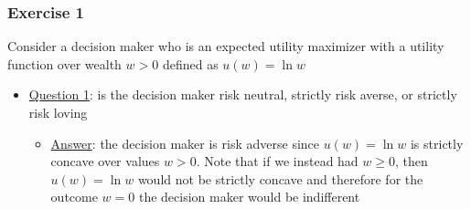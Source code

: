 \documentclass{article}
\begin{document}
\subsubsection{Exercise 1}
Consider a decision maker who is an expected utility maximizer with a utility function over wealth $w > 0$ defined as $u(w) = \ln w$ \par \vspace{0.3em}
  \begin{itemize}
    \item  \underline{Question 1}: is the decision maker risk neutral, strictly risk averse, or strictly risk loving
    \begin{itemize}
      \item  \underline{Answer}: the decision maker is risk adverse since $u(w) = \ln w$ is strictly concave over values $w > 0$. Note that if we instead had $w \geq 0$, then $u(w) = \ln w$ would not be strictly concave and therefore for the outcome $w=0$ the decision maker would be indifferent
    \end{itemize}
  \end{itemize}
\end{document}

